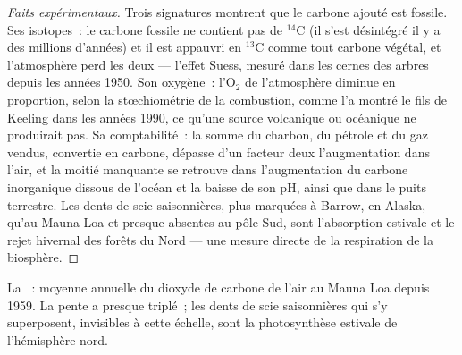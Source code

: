 \begin{proof}[Faits expérimentaux]
Trois signatures montrent que le carbone ajouté est fossile. Ses
isotopes~: le carbone fossile ne contient pas de $\mathrm{{}^{14}C}$ (il s'est
désintégré il y a des millions d'années) et il est appauvri en $\mathrm{{}^{13}C}$ comme tout carbone
végétal, et l'atmosphère perd les deux --- l'effet Suess, mesuré dans les
cernes des arbres depuis les années 1950. Son oxygène~: l'$\mathrm{O_2}$ de
l'atmosphère diminue en proportion, selon la stœchiométrie de la
combustion, comme l'a montré le fils de Keeling dans les années 1990, ce
qu'une source volcanique ou océanique ne produirait pas. Sa
comptabilité~: la somme du charbon, du pétrole et du gaz vendus, convertie
en carbone, dépasse d'un facteur deux l'augmentation dans l'air, et la
moitié manquante se retrouve dans l'augmentation du carbone inorganique
dissous de l'océan et la baisse de son pH, ainsi que dans le puits
terrestre. Les dents de scie saisonnières, plus marquées à Barrow, en
Alaska, qu'au Mauna Loa et presque absentes au pôle Sud, sont
l'absorption estivale et le rejet hivernal des forêts du Nord --- une
mesure directe de la respiration de la biosphère.
\end{proof}

\begin{omfigure}

{\small La ~: moyenne annuelle du dioxyde de carbone de
l'air au Mauna Loa depuis 1959. La pente a presque triplé~; les dents de
scie saisonnières qui s'y superposent, invisibles à cette échelle, sont
la photosynthèse estivale de l'hémisphère nord.}
\end{omfigure}

